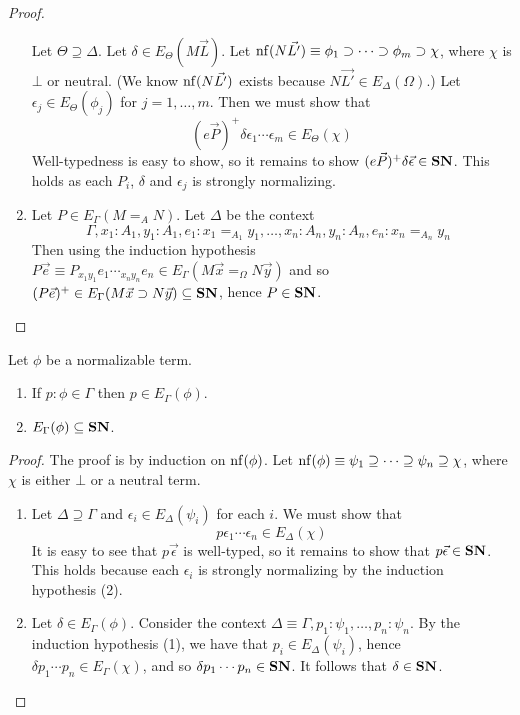 \begin{proof}
\begin{enumerate}
Let $\Theta \supseteq \Delta$.  Let $\delta \in E_\Theta(M \vec{L})$.
Let $\mathrm{nf} ( {N \vec{L'}} ) \equiv \phi_1 \supset \cdots \supset \phi_m \supset \chi$,
where $\chi$ is $\bot$ or neutral.  (We know $\mathrm{nf} ( {N \vec{L'}} )$ exists because
$N \vec{L'} \in E_\Delta(\Omega)$.)  Let $\epsilon_j \in E_\Theta(\phi_j)$ for
$j = 1, \ldots, m$.  Then we must show that
\[ (e \vec{P})^+ \delta \epsilon_1 \cdots \epsilon_m \in E_\Theta(\chi) \]
Well-typedness is easy to show, so it remains to show $(e \vec{P})^+ \delta \vec{\epsilon} \in \mathbf{SN}$.  This holds as each $P_i$, $\delta$ and $\epsilon_j$ is
strongly normalizing.
\item
Let $P \in E_\Gamma(M =_A N)$.  Let $\Delta$ be the context
\[ \Gamma, x_1 : A_1, y_1 : A_1, e_1 : x_1 =_{A_1} y_1, \ldots, x_n : A_n, y_n : A_n, e_n : x_n =_{A_n} y_n \enspace \]
Then using the induction hypothesis $P \vec{e} \equiv P_{x_1 y_1} e_1 \cdots_{x_n y_n} e_n \in E_\Gamma(M \vec{x} =_\Omega N \vec{y})$ and so
$(P \vec{e})^+ \in E_\Gamma(M \vec{x} \supset N \vec{y}) \subseteq \mathbf{SN}$, hence $P \in \mathbf{SN}$.
\end{enumerate}
\end{proof}

\begin{lm}
Let $\phi$ be a normalizable term.
\begin{enumerate}
\item
If $p : \phi \in \Gamma$ then $p \in E_\Gamma(\phi)$.
\item
$E_\Gamma(\phi) \subseteq \mathbf{SN}$.
\end{enumerate}
\end{lm}

\begin{proof}
The proof is by induction on $\mathrm{nf} ( {\phi} )$.
Let $\mathrm{nf} ( {\phi} ) \equiv \psi_1 \supseteq \cdots \supseteq \psi_n \supseteq \chi$,
where $\chi$ is either $\bot$ or a neutral term.  
\begin{enumerate}
\item
Let $\Delta \supseteq \Gamma$ and $\epsilon_i \in E_\Delta(\psi_i)$ for
each $i$.  We must show that
\[ p \epsilon_1 \cdots \epsilon_n \in E_\Delta(\chi) \]
It is easy to see that $p \vec{\epsilon}$ is well-typed, so it remains to show that $p \vec{\epsilon} \in \mathbf{SN}$.
This holds because each $\epsilon_i$ is strongly normalizing by the induction hypothesis (2).
\item
Let $\delta \in E_\Gamma(\phi)$.  Consider the context $\Delta \equiv \Gamma, p_1 : \psi_1, \ldots, p_n : \psi_n$.
By the induction hypothesis (1), we have that $p_i \in E_\Delta(\psi_i)$, hence
$\delta p_1 \cdots p_n \in E_\Gamma(\chi)$, and so $\delta p_1 \cdots p_n \in \mathbf{SN}$.
It follows that $\delta \in \mathbf{SN}$.
\end{enumerate}
\end{proof}

